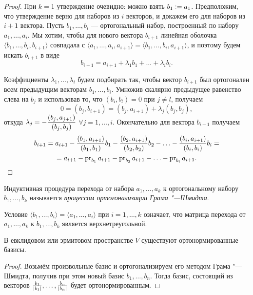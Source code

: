\begin{proof}
    При $k = 1$ утверждение очевидно: можно взять $b_1 \vcentcolon = a_1$. Предположим, что утверждение верно для наборов из $i$ векторов, и докажем его для наборов из $i + 1$ вектора. Пусть $b_1, \ldots, b_i$ --- ортогональный набор, построенный по набору $a_1, \ldots, a_i$. Мы хотим, чтобы для нового вектора $b_{i + 1}$ линейная оболочка $\langle b_1, \ldots, b_i, b_{i + 1}\rangle$ совпадала с $\langle a_1, \ldots, a_i, a_{i + 1}\rangle = \langle b_1, \ldots, b_i, a_{i + 1}\rangle$, и поэтому будем искать $b_{i + 1}$ в виде
    \[
        b_{i + 1} = a_{i + 1} + \lambda_1b_1 + \ldots + \lambda_ib_i.
    \]

    Коэффициенты $\lambda_1, \ldots, \lambda_i$ будем подбирать так, чтобы вектор $b_{i + 1}$ был ортогонален всем предыдущим векторам $b_1, \ldots, b_i$. Умножив скалярно предыдущее равенство слева на $b_j$ и использовав то, что $(b_i, b_l) = 0$ при $j \ne l$, получаем
    \[
        0 = (b_j, b_{i + 1}) = (b_j, a_{i + 1}) + \lambda_j(b_j, b_j),
    \]
    откуда $\displaystyle\lambda_j = -\frac{(b_j, a_{j + 1})}{(b_j, b_j)}$ $\forall j = 1, \ldots, i$. Окончательно для вектора $b_{i + 1}$ получаем
    \begin{multline*}
        b_{i + 1} = a_{i + 1} - \frac{(b_1, a_{i + 1})}{(b_1, b_1)}b_1 - \frac{(b_2, a_{i + 1})}{(b_2, b_2)}b_2 - \ldots - \frac{(b_i, a_{i + 1})}{(b_i, b_i)}b_i =\\ = a_{i + 1} - \operatorname{pr}_{b_1}a_{i + 1} - \operatorname{pr}_{b_2}{a_{i + 1}} - \ldots - \operatorname{pr}_{b_i}{a_{i + 1}}.
    \end{multline*}
\end{proof}

\begin{definition}
    Индуктивная процедура перехода от набора $a_1, \ldots, a_k$ к ортогональному набору $b_1, \ldots, b_k$ называется \textit{процессом ортогонализации Грама "---Шмидта}.
\end{definition}

Условие $\langle b_1, \ldots, b_i\rangle = \langle a_1, \ldots, a_i\rangle$ при $i = 1, \ldots, k$ означает, что матрица перехода от $a_1, \ldots, a_k$ к $b_1, \ldots, b_k$ является верхнетреугольной.

\begin{corollary}
    В евклидовом или эрмитовом пространстве $V$ существуют ортонормированные базисы.
\end{corollary}

\begin{proof}
    Возьмём произвольные базис и ортогонализируем его методом Грама "---Шмидта, получив при этом новый базис $b_1, \ldots, b_n$. Тогда базис, состоящий из векторов $\frac{b_1}{\left\lvert b_1\right\rvert}, \ldots, \frac{b_n}{\left\lvert b_n\right\rvert}$ будет ортонормированным.
\end{proof}


